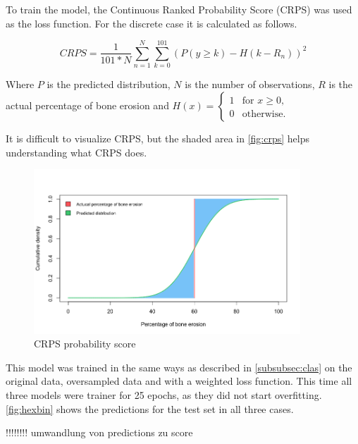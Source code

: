 \documentclass[12pt]{article}
\begin{document}
To train the model, the Continuous Ranked Probability Score (CRPS) was used as the loss function. For the discrete case it is calculated as follows. \cite{crps}

$$CRPS = \frac{1}{101 * N} \sum\limits_{n=1}^{N} \sum\limits_{k=0}^{101} (P(y \geq k) - H(k - R_n))^2$$

Where $P$ is the predicted distribution, $N$ is the number of observations, $R$ is the actual percentage of bone erosion and $H(x) = \begin{cases}
1 & \text{for $x \geq 0$,}\\
0 & \text{otherwise.}
\end{cases}$ \cite{crps}

It is difficult to visualize CRPS, but the shaded area in \autoref{fig:crps} helps understanding what CRPS does. \cite{crps}

\begin{figure}[ht]
\includegraphics[width=10cm]{crps}	
\caption{CRPS probability score}
\label{fig:crps}
\end{figure}

This model was trained in the same ways as described in \autoref{subsubsec:clas} on the original data, oversampled data and with a weighted loss function. This time all three models were trainer for 25 epochs, as they did not start overfitting. \autoref{fig:hexbin} shows the predictions for the test set in all three cases.

!!!!!!!! umwandlung von predictions zu score
\end{document}
